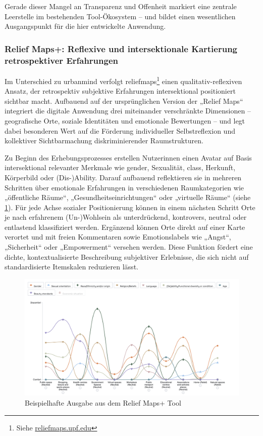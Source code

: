 Gerade dieser Mangel an Transparenz und Offenheit markiert eine zentrale Leerstelle im bestehenden Tool-Ökosystem -- und bildet einen wesentlichen Ausgangspunkt für die hier entwickelte Anwendung.

\subsubsection*{Relief Maps+: Reflexive und intersektionale Kartierung retrospektiver Erfahrungen}

Im Unterschied zu \gls{urbanmind} verfolgt \gls{reliefmaps}\footnote{Siehe \href{https://reliefmaps.upf.edu/}{reliefmaps.upf.edu}} einen qualitativ-reflexiven Ansatz, der retrospektiv subjektive Erfahrungen intersektional positioniert sichtbar macht. Aufbauend auf der ursprünglichen Version der „Relief Maps“ \parencite{rodo-de-zarateDevelopingGeographiesIntersectionality2014} integriert die digitale Anwendung drei miteinander verschränkte Dimensionen -- geografische Orte, soziale Identitäten und emotionale Bewertungen -- und legt dabei besonderen Wert auf die Förderung individueller Selbstreflexion und kollektiver Sichtbarmachung diskriminierender Raumstrukturen. %

Zu Beginn des Erhebungsprozesses erstellen Nutzer\genderstern innen einen Avatar auf Basis intersektional relevanter Merkmale wie \gls{gender}, Sexualität, \gls{class}, Herkunft, Körperbild oder (Dis-)Ability. Darauf aufbauend reflektieren sie in mehreren Schritten über emotionale Erfahrungen in verschiedenen Raumkategorien wie „öffentliche Räume“, „Gesundheitseinrichtungen“ oder „virtuelle Räume“ (siehe \cref{fig:relief_maps_plus_screenshot_1}). Für jede Achse sozialer Positionierung können in einem nächsten Schritt Orte je nach erfahrenem (Un-)Wohlsein als unterdrückend, kontrovers, neutral oder entlastend klassifiziert werden. Ergänzend können Orte direkt auf einer Karte verortet und mit freien Kommentaren sowie Emotionslabels wie „Angst“, „Sicherheit“ oder „Empowerment“ versehen werden. Diese Funktion fördert eine dichte, kontextualisierte Beschreibung subjektiver Erlebnisse, die sich nicht auf standardisierte Itemskalen reduzieren lässt.

\begin{figure}[htbp]
    \centering
    \includegraphics[width=\textwidth]{Arbeit/images/reliefmap.png}
    \caption{Beispielhafte Ausgabe aus dem Relief Maps+ Tool}
    \label{fig:relief_maps_plus_screenshot_1}
\end{figure}

